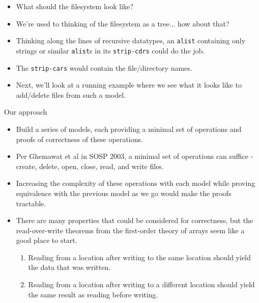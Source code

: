 \documentclass{beamer}
\begin{document}
\begin{frame}
  \begin{itemize}
  \item What should the filesystem look like?
  \item We're used to thinking of the filesystem as a tree... how
    about that?
  \item Thinking along the lines of recursive datatypes, an \texttt{alist}
    containing only strings or similar \texttt{alist}s in its
    \texttt{strip-cdrs} could do the job.
  \item The \texttt{strip-cars} would contain the file/directory
    names.
  \item Next, we'll look at a running example where we see what it
    looks like to add/delete files from such a model.
  \end{itemize}
\end{frame}

\begin{frame}{Our approach}
  \begin{itemize}
  \item Build a series of models, each providing a minimal set of
    operations and proofs of correctness of these operations.
  \item Per Ghemawat et al in SOSP 2003, a minimal set of operations
    can suffice - create, delete, open, close, read, and write files.
  \item Increasing the complexity of these operations with each model
    while proving equivalence with the previous model as we go would
    make the proofs tractable.
  \item There are many properties that could be considered for
    correctness, but the read-over-write theorems from the first-order
    theory of arrays seem like a good place to start.
    \begin {enumerate}
    \item Reading from a location after writing to the same location
      should yield the data that was written.
    \item Reading from a location after writing to a different
      location should yield the same result as reading before writing.
    \end {enumerate}
  \end{itemize}
\end{frame}
\end{document}
